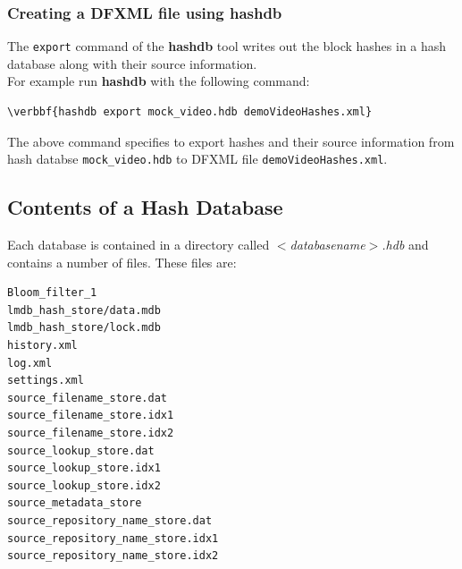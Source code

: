 \documentclass[11pt,fleqn]{article} %
\begin{document}
\subsubsection{Creating a DFXML file using \textbf{hashdb}}
The \texttt{export} command of the \textbf{hashdb} tool writes out the block hashes in a hash database along with their source information. \\

For example run \textbf{hashdb} with the following command:\\
\begin{Verbatim}[commandchars=\\\{\}]
\verbbf{hashdb export mock_video.hdb demoVideoHashes.xml}
\end{Verbatim}
The above command specifies to export hashes and their source information from hash databse \texttt{mock\_video.hdb} to DFXML file \texttt{demoVideoHashes.xml}.

\subsection{Contents of a Hash Database}
Each \hash database is contained in a directory called \textit{$<$databasename$>$.hdb} and contains a number of files. These files are:
\begin{verbatim}
Bloom_filter_1
lmdb_hash_store/data.mdb
lmdb_hash_store/lock.mdb
history.xml
log.xml
settings.xml
source_filename_store.dat
source_filename_store.idx1
source_filename_store.idx2
source_lookup_store.dat
source_lookup_store.idx1
source_lookup_store.idx2
source_metadata_store
source_repository_name_store.dat
source_repository_name_store.idx1
source_repository_name_store.idx2
\end{verbatim}
\end{document}
